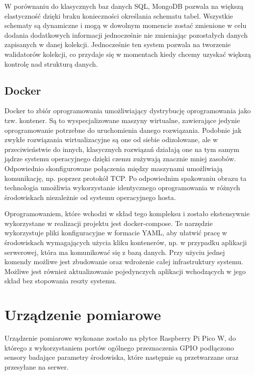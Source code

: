 W porównaniu do klasycznych baz danych SQL, MongoDB pozwala na większą elastyczność dzięki braku
konieczności określania schematu tabel. Wszystkie schematy są dynamiczne i mogą w dowolnym momencie 
zostać zmienione w celu dodania dodatkowych informacji jednocześnie nie zmieniając pozostałych
danych zapisanych w danej kolekcji. Jednocześnie ten system pozwala na tworzenie 
walidatorów kolekcji, co przydaje się w momentach kiedy chcemy uzyskać większą kontrolę
nad strukturą danych.

\subsection*{Docker}
Docker\cite{docker} to zbiór oprogramowania umożliwiający dystrybucję oprogramowania jako tzw. kontener.
Są to wyspecjalizowane maszyny wirtualne, zawierające jedynie oprogramowanie potrzebne
do uruchomienia danego rozwiązania. Podobnie jak zwykłe rozwiązania wirtualizacyjne
są one od siebie odizolowane, ale w przeciwieństwie do innych, klasycznych rozwiązań
działają one na tym samym jądrze systemu operacyjnego dzięki czemu zużywają znacznie
mniej zasobów\cite{docker:what_is_container}. Odpowiednio skonfigurowane połączenia
między maszynami umożliwiają komunikację, np. poprzez protokół TCP. 
Po odpowiednim spakowaniu obrazu ta technologia umożliwia wykorzystanie identycznego
oprogramowania w różnych środowiskach niezależnie od systemu operacyjnego hosta.

Oprogramowaniem, które wchodzi w skład tego kompleksu i zostało ekstensywnie wykorzystane 
w realizacji projektu jest docker-compose. Te narzędzie wykorzystuje pliki konfiguracyjne
w formacie YAML, aby ułatwić pracę w środowiskach wymagających użycia kliku kontenerów, np.
w przypadku aplikacji serwerowej, która ma komunikować się z bazą danych. Przy użyciu
jednej komendy możliwe jest zbudowanie oraz wdrożenie całej infrastruktury systemu.
Możliwe jest również aktualizowanie pojedynczych aplikacji wchodzących w jego skład 
bez stopowania reszty systemu.

\section{Urządzenie pomiarowe}
Urządzenie pomiarowe wykonane zostało na płytce Raspberry Pi Pico W, do którego z wykorzystaniem
portów ogólnego przeznaczenia GPIO podłączono sensory badające parametry środowiska, 
które następnie są przetwarzane oraz przesyłane na serwer.

